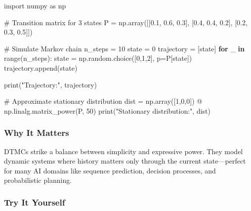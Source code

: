 \documentclass[
  letterpaper,
  DIV=11,
  numbers=noendperiod]{scrreprt}
\newenvironment{Shaded}{\begin{snugshade}}{\end{snugshade}}
\newcommand{\BuiltInTok}[1]{\textcolor[rgb]{0.00,0.23,0.31}{#1}}
\newcommand{\CommentTok}[1]{\textcolor[rgb]{0.37,0.37,0.37}{#1}}
\newcommand{\ControlFlowTok}[1]{\textcolor[rgb]{0.00,0.23,0.31}{\textbf{#1}}}
\newcommand{\DecValTok}[1]{\textcolor[rgb]{0.68,0.00,0.00}{#1}}
\newcommand{\FloatTok}[1]{\textcolor[rgb]{0.68,0.00,0.00}{#1}}
\newcommand{\ImportTok}[1]{\textcolor[rgb]{0.00,0.46,0.62}{#1}}
\newcommand{\KeywordTok}[1]{\textcolor[rgb]{0.00,0.23,0.31}{\textbf{#1}}}
\newcommand{\NormalTok}[1]{\textcolor[rgb]{0.00,0.23,0.31}{#1}}
\newcommand{\OperatorTok}[1]{\textcolor[rgb]{0.37,0.37,0.37}{#1}}
\newcommand{\StringTok}[1]{\textcolor[rgb]{0.13,0.47,0.30}{#1}}
\begin{document}
\begin{Shaded}
\begin{Highlighting}[]
\ImportTok{import}\NormalTok{ numpy }\ImportTok{as}\NormalTok{ np}

\CommentTok{\# Transition matrix for 3 states}
\NormalTok{P }\OperatorTok{=}\NormalTok{ np.array([[}\FloatTok{0.1}\NormalTok{, }\FloatTok{0.6}\NormalTok{, }\FloatTok{0.3}\NormalTok{],}
\NormalTok{              [}\FloatTok{0.4}\NormalTok{, }\FloatTok{0.4}\NormalTok{, }\FloatTok{0.2}\NormalTok{],}
\NormalTok{              [}\FloatTok{0.2}\NormalTok{, }\FloatTok{0.3}\NormalTok{, }\FloatTok{0.5}\NormalTok{]])}

\CommentTok{\# Simulate Markov chain}
\NormalTok{n\_steps }\OperatorTok{=} \DecValTok{10}
\NormalTok{state }\OperatorTok{=} \DecValTok{0}
\NormalTok{trajectory }\OperatorTok{=}\NormalTok{ [state]}
\ControlFlowTok{for}\NormalTok{ \_ }\KeywordTok{in} \BuiltInTok{range}\NormalTok{(n\_steps):}
\NormalTok{    state }\OperatorTok{=}\NormalTok{ np.random.choice([}\DecValTok{0}\NormalTok{,}\DecValTok{1}\NormalTok{,}\DecValTok{2}\NormalTok{], p}\OperatorTok{=}\NormalTok{P[state])}
\NormalTok{    trajectory.append(state)}

\BuiltInTok{print}\NormalTok{(}\StringTok{"Trajectory:"}\NormalTok{, trajectory)}

\CommentTok{\# Approximate stationary distribution}
\NormalTok{dist }\OperatorTok{=}\NormalTok{ np.array([}\DecValTok{1}\NormalTok{,}\DecValTok{0}\NormalTok{,}\DecValTok{0}\NormalTok{]) }\OperatorTok{@}\NormalTok{ np.linalg.matrix\_power(P, }\DecValTok{50}\NormalTok{)}
\BuiltInTok{print}\NormalTok{(}\StringTok{"Stationary distribution:"}\NormalTok{, dist)}
\end{Highlighting}
\end{Shaded}

\subsubsection{Why It Matters}\label{why-it-matters-90}

DTMCs strike a balance between simplicity and expressive power. They
model dynamic systems where history matters only through the current
state---perfect for many AI domains like sequence prediction, decision
processes, and probabilistic planning.

\subsubsection{Try It Yourself}\label{try-it-yourself-192}
\end{document}

